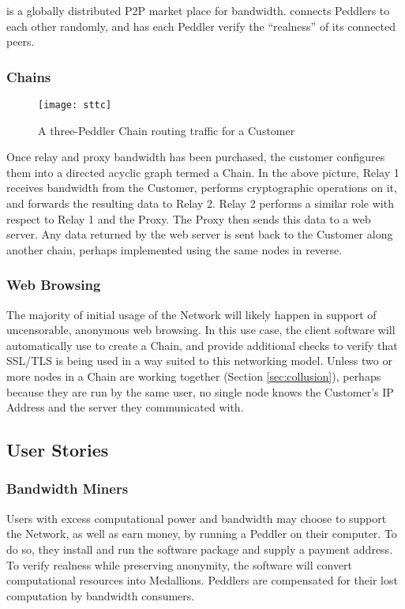\TOM{} is a globally distributed P2P market place for bandwidth. \TOM{} connects Peddlers to each other randomly, and has each Peddler verify the ``realness'' of its connected peers.

\subsubsection{Chains}

\begin{figure}[htbp]
  \centering
  \texttt{[image: sttc]}
  \caption{A three-Peddler Chain routing traffic for a Customer}
\end{figure}

Once relay and proxy bandwidth has been purchased, the customer configures them into a directed acyclic graph termed a Chain. In the above picture, Relay 1 receives bandwidth from the Customer, performs cryptographic operations on it, and forwards the resulting data to Relay 2. Relay 2 performs a similar role with respect to Relay 1 and the Proxy. The Proxy then sends this data to a web server. Any data returned by the web server is sent back to the Customer along another chain, perhaps implemented using the same nodes in reverse.

\subsubsection{Web Browsing}

The majority of initial usage of the \Orchid{} Network will likely happen in support of uncensorable, anonymous web browsing. In this use case, the client software will automatically use \tOM{} to create a Chain, and provide additional checks to verify that SSL/TLS is being used in a way suited to this networking model. Unless two or more nodes in a Chain are working together (Section \ref{sec:collusion}), perhaps because they are run by the same user, no single node knows the Customer's IP Address and the server they communicated with.

\subsection{User Stories}

\subsubsection{Bandwidth Miners}

Users with excess computational power and bandwidth may choose to support the \Orchid{} Network, as well as earn money, by running a Peddler on their computer. To do so, they install and run the \Orchid{} software package and supply a payment address. To verify realness while preserving anonymity, the software will convert computational resources into Medallions. Peddlers are compensated for their lost computation by bandwidth consumers.

